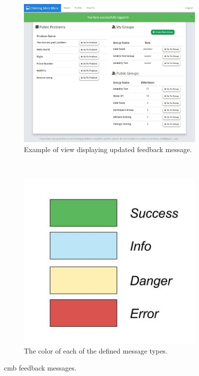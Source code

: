 \begin{figure}[h!]
    \centering
    \begin{subfigure}[b]{0.56\textwidth}
        \includegraphics[width=\textwidth]{figs/new_message.jpg}
        \caption{Example of view displaying updated feedback message.}
        \label{fig:new-message}
    \end{subfigure}
    ~ %
    \begin{subfigure}[b]{0.35\textwidth}
        \includegraphics[width=\textwidth]{figs/type_color.jpg}
        \caption{The color of each of the defined message types.}
        \label{fig:type-color}
    \end{subfigure}
    \caption[Climbing Mont Blanc feedback messages.]{\gls{cmb} feedback messages.}
    \label{fig:new-feedback}
\end{figure}
